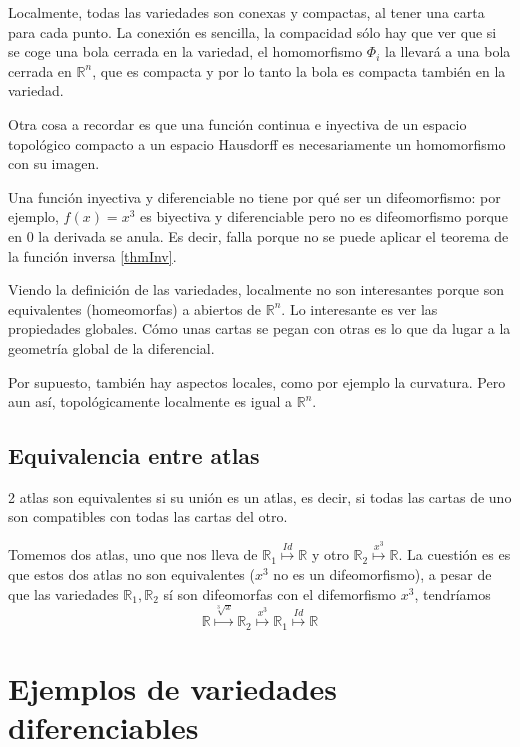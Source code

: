 Localmente, todas las variedades son conexas y compactas, al tener una carta para cada punto. La conexión es sencilla, la compacidad sólo hay que ver que si se coge una bola cerrada en la variedad, el homomorfismo $Φ_i$ la llevará a una bola cerrada en $ℝ^n$, que es compacta y por lo tanto la bola es compacta también en la variedad.

Otra cosa a recordar es que una función continua e inyectiva de un espacio topológico compacto a un espacio Hausdorff es necesariamente un homomorfismo con su imagen.

Una función inyectiva y diferenciable no tiene por qué ser un difeomorfismo: por ejemplo, $f(x) = x^3$ es biyectiva y diferenciable pero no es difeomorfismo porque en $0$ la derivada se anula. Es decir, falla porque no se puede aplicar el teorema de la función inversa \eqref{thmInv}.

Viendo la definición de las variedades, localmente no son interesantes porque son equivalentes (homeomorfas) a abiertos de $ℝ^n$. Lo interesante es ver las propiedades globales. Cómo unas cartas se pegan con otras es lo que da lugar a la geometría global de la diferencial.

Por supuesto, también hay aspectos locales, como por ejemplo la curvatura. Pero aun así, topológicamente localmente es igual a $ℝ^n$.

\subsection{Equivalencia entre atlas}

\begin{defn}\label{defAtlasEquiv}
2 atlas son equivalentes si su unión es un atlas, es decir, si todas las cartas de uno son compatibles con todas las cartas del otro.
\end{defn}

Tomemos dos atlas, uno que nos lleva de $ℝ_1 \overset{Id}{\longmapsto} ℝ$ y otro $ℝ_2 \overset{x^3}{\longmapsto} ℝ$. La cuestión es es que estos dos atlas no son equivalentes ($x^3$ no es un difeomorfismo), a pesar de que las variedades $ℝ_1, ℝ_2$ sí son difeomorfas con el difemorfismo $x^3$, tendríamos \[ ℝ \overset{\sqrt[3]{x}}{\longmapsto} ℝ_2 \overset{x^3}{\longmapsto} ℝ_1 \overset{Id}{\longmapsto} ℝ \]



\section{Ejemplos de variedades diferenciables}

